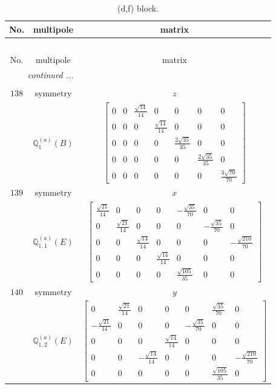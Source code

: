 \documentclass[fleqn,8pt,landscape]{jsarticle}
\begin{document}
\begin{longtable}{ccc}
\caption{(d,f) block.}
 \\
 \hline \hline
No. & multipole & matrix \\ \hline \endfirsthead

\multicolumn{2}{l}{\tablename\ \thetable{}} \\
 \hline \hline
No. & multipole & matrix \\ \hline \endhead

 \hline \hline
\multicolumn{2}{r}{\footnotesize\it continued ...} \\ \endfoot

 \hline \hline
\multicolumn{2}{r}{} \\ \endlastfoot

$ 138 $ & $ \text{symmetry} $ & $ z $ \\
$  $ & $ \mathbb{Q}_{1}^{(a)}(B) $ & $ \begin{bmatrix} 0 & 0 & \frac{\sqrt{14}}{14} & 0 & 0 & 0 & 0 \\ 0 & 0 & 0 & \frac{\sqrt{14}}{14} & 0 & 0 & 0 \\ 0 & 0 & 0 & 0 & \frac{2 \sqrt{35}}{35} & 0 & 0 \\ 0 & 0 & 0 & 0 & 0 & \frac{2 \sqrt{35}}{35} & 0 \\ 0 & 0 & 0 & 0 & 0 & 0 & \frac{3 \sqrt{70}}{70} \end{bmatrix} $ \\ \hline
$ 139 $ & $ \text{symmetry} $ & $ x $ \\
$  $ & $ \mathbb{Q}_{1,1}^{(a)}(E) $ & $ \begin{bmatrix} \frac{\sqrt{21}}{14} & 0 & 0 & 0 & - \frac{\sqrt{35}}{70} & 0 & 0 \\ 0 & \frac{\sqrt{21}}{14} & 0 & 0 & 0 & - \frac{\sqrt{35}}{70} & 0 \\ 0 & 0 & \frac{\sqrt{14}}{14} & 0 & 0 & 0 & - \frac{\sqrt{210}}{70} \\ 0 & 0 & 0 & \frac{\sqrt{14}}{14} & 0 & 0 & 0 \\ 0 & 0 & 0 & 0 & \frac{\sqrt{105}}{35} & 0 & 0 \end{bmatrix} $ \\ \hline
$ 140 $ & $ \text{symmetry} $ & $ y $ \\
$  $ & $ \mathbb{Q}_{1,2}^{(a)}(E) $ & $ \begin{bmatrix} 0 & \frac{\sqrt{21}}{14} & 0 & 0 & 0 & \frac{\sqrt{35}}{70} & 0 \\ - \frac{\sqrt{21}}{14} & 0 & 0 & 0 & - \frac{\sqrt{35}}{70} & 0 & 0 \\ 0 & 0 & 0 & \frac{\sqrt{14}}{14} & 0 & 0 & 0 \\ 0 & 0 & - \frac{\sqrt{14}}{14} & 0 & 0 & 0 & - \frac{\sqrt{210}}{70} \\ 0 & 0 & 0 & 0 & 0 & \frac{\sqrt{105}}{35} & 0 \end{bmatrix} $ \\ \hline

\end{longtable}
\end{document}
